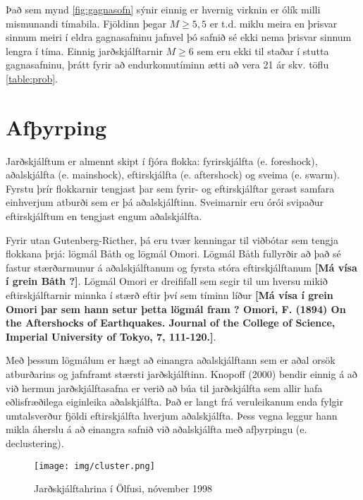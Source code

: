\documentclass[10pt,a4paper,titlepage,twoside]{article}
\newcommand{\note}[1]{\textcolor{ymagray}{\textbf{[#1]}}}
\begin{document}
Það sem mynd \ref{fig:gagnasofn} sýnir einnig er hvernig virknin er ólík milli mismunandi tímabila. Fjöldinn þegar $M\geq5,5$ er t.d. miklu meira en þrisvar sinnum meiri í eldra gagnasafninu jafnvel þó safnið sé ekki nema þrisvar sinnum lengra í tíma. Einnig jarðskjálftarnir $M\geq6$ sem eru ekki til staðar í stutta gagnasafninu, þrátt fyrir að endurkomutíminn ætti að vera 21 ár skv. töflu \ref{table:prob}.


\clearpage
\section{Afþyrping}

Jarðskjálftum er almennt skipt í fjóra flokka: fyrirskjálfta (e. foreshock), aðalskjálfta (e. mainshock), eftirskjálfta (e. aftershock) og sveima (e. swarm). Fyrstu þrír flokkarnir tengjast þar sem fyrir- og eftirskjálftar gerast samfara einhverjum atburði sem er þá aðalskjálftinn. Sveimarnir eru órói svipaður eftirskjálftum en tengjast engum aðalskjálfta.

Fyrir utan Gutenberg-Ricther, þá eru tvær kenningar til viðbótar sem tengja flokkana þrjá: lögmál Båth og lögmál Omori. Lögmál Båth fullyrðir að það sé fastur stærðarmunur á aðalskjálftanum og fyrsta stóra eftirskjálftanum \note{Má vísa í grein Båth ?}. Lögmál Omori er dreififall sem segir til um hversu mikið eftirskjálftarnir minnka í stærð eftir því sem tíminn líður \note{Má vísa í grein Omori þar sem hann setur þetta lögmál fram ? Omori, F. (1894) On the Aftershocks of Earthquakes. Journal of the College of Science, Imperial University of Tokyo, 7, 111-120.}.

Með þessum lögmálum er hægt að einangra aðalskjálftann sem er aðal orsök atburðarins og jafnframt stærsti jarðskjálftinn. Knopoff (2000) bendir einnig á að við hermun jarðskjálftasafna er verið að búa til jarðskjálfta sem allir hafa eðlisfræðilega eiginleika aðalskjálfta. Það er langt frá veruleikanum enda fylgir umtalsverður fjöldi eftirskjálfta hverjum aðalskjálfta. Þess vegna leggur hann mikla áherslu á að einangra safnið við aðalskjálfta með afþyrpingu (e. declustering).

\begin{figure}[h]
  \centering
  \texttt{[image: img/cluster.png]}
  \vspace{-4mm}
  \caption{Jarðskjálftahrina í Ölfusi, nóvember 1998}
  \label{fig:cluster}
\end{figure}
\end{document}
